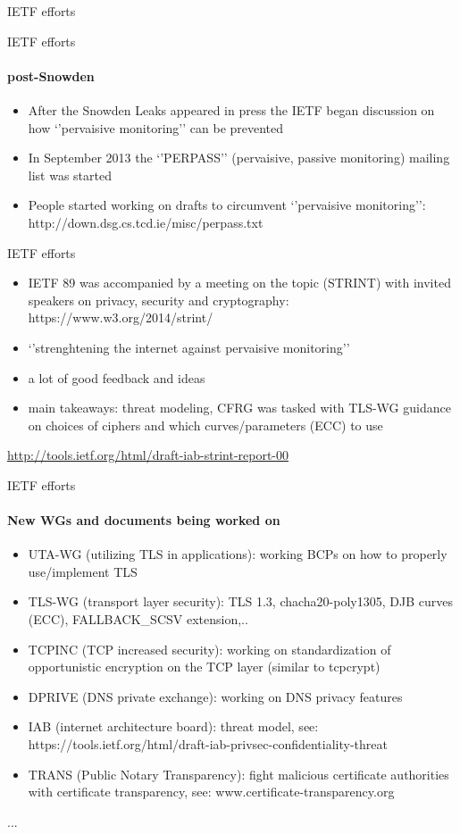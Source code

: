 \documentclass[hyperref={draft}]{beamer}
\begin{document}
\begin{frame}{IETF efforts}
  \fontsize{10}{10}\selectfont{}
\end{frame}

\begin{frame}{IETF efforts}
  \framesubtitle{post-Snowden}
  \begin{itemize}
  \item After the Snowden Leaks appeared in press the IETF began discussion on how
`'pervaisive monitoring'' can be prevented
  \item In September 2013 the `'PERPASS'' (pervaisive, passive monitoring) mailing list was started
  \item People started working on drafts to circumvent `'pervaisive monitoring'': http://down.dsg.cs.tcd.ie/misc/perpass.txt
  \end{itemize}
\end{frame}

\begin{frame}{IETF efforts}
  \begin{itemize}
    \item IETF 89 was accompanied by a meeting on the topic (STRINT) with invited speakers on privacy, security and cryptography: https://www.w3.org/2014/strint/
    \item `'strenghtening the internet against pervaisive monitoring''
    \item a lot of good feedback and ideas
    \item main takeaways: threat modeling, CFRG was tasked with TLS-WG guidance on choices of ciphers and which curves/parameters (ECC) to use
  \end{itemize}
\tiny
\url{http://tools.ietf.org/html/draft-iab-strint-report-00}
\end{frame}


\begin{frame}{IETF efforts}
  \framesubtitle{New WGs and documents being worked on }
  \begin{itemize}
    \item UTA-WG (utilizing TLS in applications): working BCPs on how to properly use/implement TLS
    \item TLS-WG (transport layer security): TLS 1.3, chacha20-poly1305, DJB curves (ECC), FALLBACK\_SCSV extension,..
    \item TCPINC (TCP increased security): working on standardization of opportunistic encryption on the TCP layer (similar to tcpcrypt)
    \item DPRIVE (DNS private exchange): working on DNS privacy features
    \item IAB (internet architecture board): threat model, see: https://tools.ietf.org/html/draft-iab-privsec-confidentiality-threat
    \item TRANS (Public Notary Transparency): fight malicious certificate authorities with certificate transparency, see: www.certificate-transparency.org
  \end{itemize}
...
\end{frame}
\end{document}
